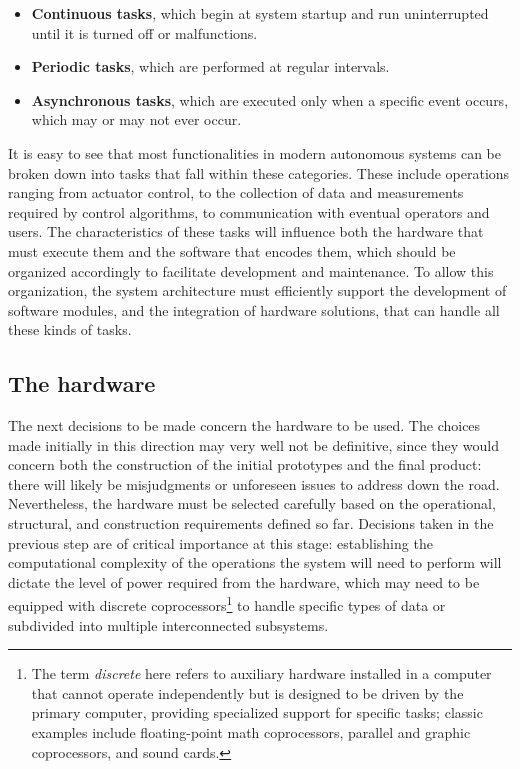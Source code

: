 \begin{itemize}
    \item \textbf{Continuous tasks}, which begin at system startup and run uninterrupted until it is turned off or malfunctions.
    \item \textbf{Periodic tasks}, which are performed at regular intervals.
    \item \textbf{Asynchronous tasks}, which are executed only when a specific event occurs, which may or may not ever occur.
\end{itemize}

It is easy to see that most functionalities in modern autonomous systems can be broken down into tasks that fall within these categories. These include operations ranging from actuator control, to the collection of data and measurements required by control algorithms, to communication with eventual operators and users. The characteristics of these tasks will influence both the hardware that must execute them and the software that encodes them, which should be organized accordingly to facilitate development and maintenance. To allow this organization, the system architecture must efficiently support the development of software modules, and the integration of hardware solutions, that can handle all these kinds of tasks.

\subsection{The hardware}
\label{sec:design_challenges_hardware}
The next decisions to be made concern the hardware to be used. The choices made initially in this direction may very well not be definitive, since they would concern both the construction of the initial prototypes and the final product: there will likely be misjudgments or unforeseen issues to address down the road. Nevertheless, the hardware must be selected carefully based on the operational, structural, and construction requirements defined so far. Decisions taken in the previous step are of critical importance at this stage: establishing the computational complexity of the operations the system will need to perform will dictate the level of power required from the hardware, which may need to be equipped with discrete coprocessors\footnote{The term \emph{discrete} here refers to auxiliary hardware installed in a computer that cannot operate independently but is designed to be driven by the primary computer, providing specialized support for specific tasks; classic examples include floating-point math coprocessors, parallel and graphic coprocessors, and sound cards.} to handle specific types of data or subdivided into multiple interconnected subsystems.

